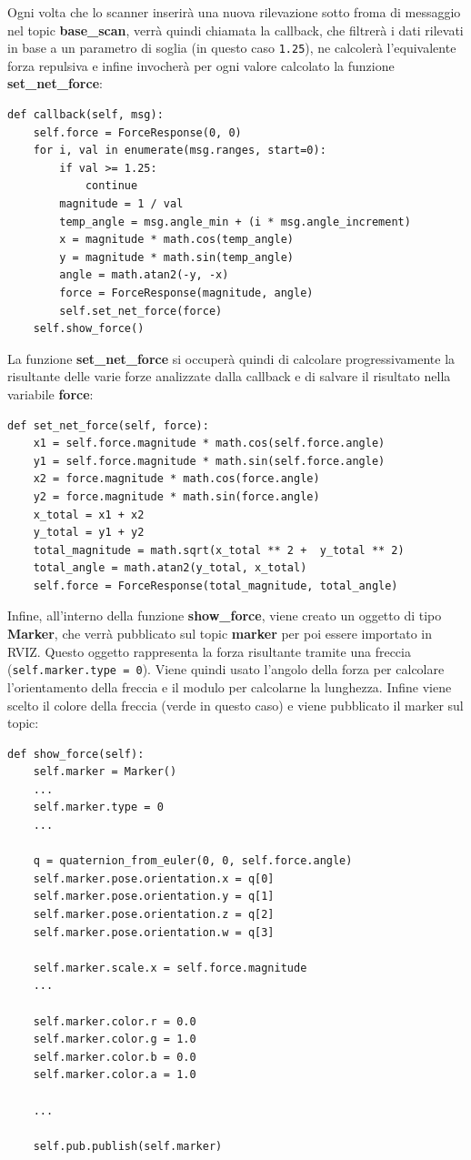 \documentclass[Lau, binding=0.6cm, oneside]{sapthesis}
\begin{document}
Ogni volta che lo scanner inserirà una nuova rilevazione sotto froma di messaggio nel topic \textbf{base\_scan}, verrà quindi chiamata la callback, che filtrerà i dati rilevati in base a un parametro di soglia (in questo caso \lstinline{1.25}), ne calcolerà l'equivalente forza repulsiva e infine invocherà per ogni valore calcolato la funzione \textbf{set\_net\_force}:

\begin{lstlisting}
def callback(self, msg):
    self.force = ForceResponse(0, 0)
    for i, val in enumerate(msg.ranges, start=0):
        if val >= 1.25:
            continue
        magnitude = 1 / val
        temp_angle = msg.angle_min + (i * msg.angle_increment)
        x = magnitude * math.cos(temp_angle)
        y = magnitude * math.sin(temp_angle)
        angle = math.atan2(-y, -x)
        force = ForceResponse(magnitude, angle)
        self.set_net_force(force)
    self.show_force()
\end{lstlisting}

La funzione \textbf{set\_net\_force} si occuperà quindi di calcolare progressivamente la risultante delle varie forze analizzate dalla callback e di salvare il risultato nella variabile \textbf{force}:

\begin{lstlisting}
def set_net_force(self, force):
    x1 = self.force.magnitude * math.cos(self.force.angle)
    y1 = self.force.magnitude * math.sin(self.force.angle)
    x2 = force.magnitude * math.cos(force.angle)
    y2 = force.magnitude * math.sin(force.angle)
    x_total = x1 + x2
    y_total = y1 + y2
    total_magnitude = math.sqrt(x_total ** 2 +  y_total ** 2)
    total_angle = math.atan2(y_total, x_total)
    self.force = ForceResponse(total_magnitude, total_angle)
\end{lstlisting}

Infine, all'interno della funzione \textbf{show\_force}, viene creato un oggetto di tipo \textbf{Marker}, che verrà pubblicato sul topic \textbf{marker} per poi essere importato in RVIZ.
Questo oggetto rappresenta la forza risultante tramite una freccia (\lstinline{self.marker.type = 0}).
Viene quindi usato l'angolo della forza per calcolare l'orientamento della freccia e il modulo per calcolarne la lunghezza.
Infine viene scelto il colore della freccia (verde in questo caso) e viene pubblicato il marker sul topic:

\begin{lstlisting}
def show_force(self):
    self.marker = Marker()
    ...
    self.marker.type = 0
    ...

    q = quaternion_from_euler(0, 0, self.force.angle)
    self.marker.pose.orientation.x = q[0]
    self.marker.pose.orientation.y = q[1]
    self.marker.pose.orientation.z = q[2]
    self.marker.pose.orientation.w = q[3]

    self.marker.scale.x = self.force.magnitude
    ...

    self.marker.color.r = 0.0
    self.marker.color.g = 1.0
    self.marker.color.b = 0.0
    self.marker.color.a = 1.0

    ...

    self.pub.publish(self.marker)
\end{lstlisting}
\end{document}

